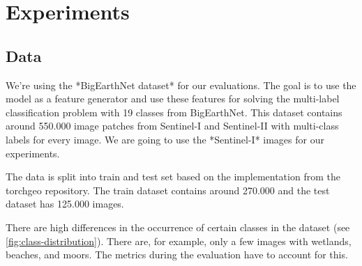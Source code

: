 \section{Experiments}
\label{sec:experiments}

\subsection{Data}

We're using the *BigEarthNet dataset* %
for our evaluations. The goal is to use the model as a feature generator and use these features for solving the multi-label classification problem with 19 classes from BigEarthNet. This dataset contains around 550.000 image patches from Sentinel-I and Sentinel-II with multi-class labels for every image. We are going to use the *Sentinel-I* images for our experiments.


The data is split into train and test set based on the implementation from the torchgeo repository. %
The train dataset contains around 270.000 and the test dataset has 125.000 images.

There are high differences in the occurrence of certain classes in the dataset (see \ref{fig:class-distribution}). There are, for example, only a few images with wetlands, beaches, and moors. The metrics during the evaluation have to account for this.


